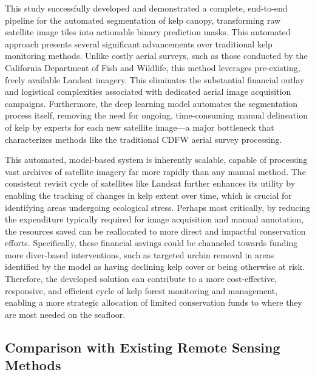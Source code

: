 \documentclass{article}
\begin{document}
This study successfully developed and demonstrated a complete, end-to-end pipeline for the automated segmentation of kelp canopy, transforming raw satellite image tiles into actionable binary prediction masks. This automated approach presents several significant advancements over traditional kelp monitoring methods. Unlike costly aerial surveys, such as those conducted by the California Department of Fish and Wildlife, this method leverages pre-existing, freely available Landsat imagery. This eliminates the substantial financial outlay and logistical complexities associated with dedicated aerial image acquisition campaigns. Furthermore, the deep learning model automates the segmentation process itself, removing the need for ongoing, time-consuming manual delineation of kelp by experts for each new satellite image—a major bottleneck that characterizes methods like the traditional CDFW aerial survey processing. 

This automated, model-based system is inherently scalable, capable of processing vast archives of satellite imagery far more rapidly than any manual method. The consistent revisit cycle of satellites like Landsat further enhances its utility by enabling the tracking of changes in kelp extent over time, which is crucial for identifying areas undergoing ecological stress. Perhaps most critically, by reducing the expenditure typically required for image acquisition and manual annotation, the resources saved can be reallocated to more direct and impactful conservation efforts. Specifically, these financial savings could be channeled towards funding more diver-based interventions, such as targeted urchin removal in areas identified by the model as having declining kelp cover or being otherwise at risk. Therefore, the developed solution can contribute to a more cost-effective, responsive, and efficient cycle of kelp forest monitoring and management, enabling a more strategic allocation of limited conservation funds to where they are most needed on the seafloor.

\subsection{Comparison with Existing Remote Sensing Methods}
\end{document}
